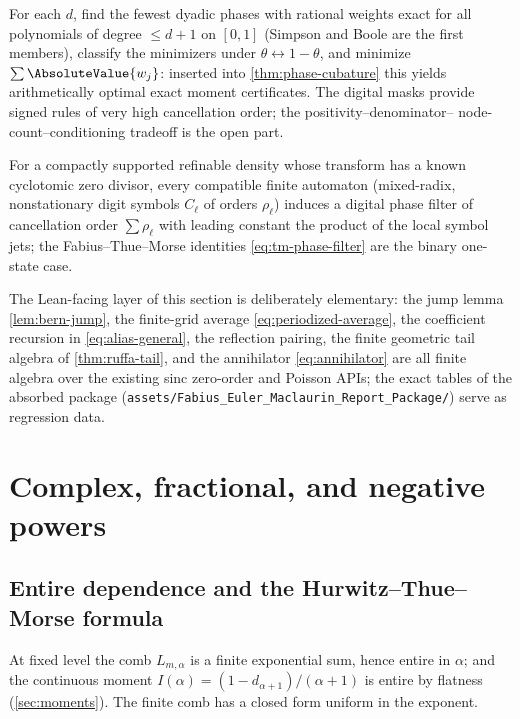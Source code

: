 \documentclass[11pt,oneside]{article}
\numberwithin{equation}{section}
\theoremstyle{definition}
\theoremstyle{remark}
\begin{document}
\begin{question}
\label{q:dyadic-phase-support}
For each $d$, find the fewest dyadic phases with rational weights
exact for all polynomials of degree $\le d+1$ on $[0,1]$ (Simpson and
Boole are the first members), classify the minimizers under
$\theta\leftrightarrow1-\theta$, and minimize $\sum\AbsoluteValue{w_j}$:
inserted into \cref{thm:phase-cubature} this yields arithmetically
optimal exact moment certificates.  The digital masks provide signed
rules of very high cancellation order; the positivity--denominator--%
node-count--conditioning tradeoff is the open part.
\end{question}

\begin{conjecture}
\label{conj:automatic-dictionary}
For a compactly supported refinable density whose transform has a
known cyclotomic zero divisor, every compatible finite automaton
(mixed-radix, nonstationary digit symbols $C_\ell$ of orders
$\rho_\ell$) induces a digital phase filter of cancellation order
$\sum\rho_\ell$ with leading constant the product of the local
symbol jets; the Fabius--Thue--Morse identities
\eqref{eq:tm-phase-filter} are the binary one-state case.
\end{conjecture}

The Lean-facing layer of this section is deliberately elementary:
the jump lemma \cref{lem:bern-jump}, the finite-grid average
\eqref{eq:periodized-average}, the coefficient recursion in
\eqref{eq:alias-general}, the reflection pairing, the finite geometric
tail algebra of \cref{thm:ruffa-tail}, and the annihilator
\eqref{eq:annihilator} are all finite algebra over the existing sinc
zero-order and Poisson APIs; the exact tables of the absorbed package
(\nolinkurl{assets/Fabius_Euler_Maclaurin_Report_Package/}) serve as
regression data.


\section{Complex, fractional, and negative powers}
\label{sec:complex}

\subsection{Entire dependence and the Hurwitz--Thue--Morse formula}

At fixed level the comb $L_{m,\alpha}$ is a finite exponential sum,
hence entire in $\alpha$; and the continuous moment
$I(\alpha)=(1-d_{\alpha+1})/(\alpha+1)$ is entire by flatness
(\cref{sec:moments}).  The finite comb has a closed form uniform in
the exponent.
\end{document}
